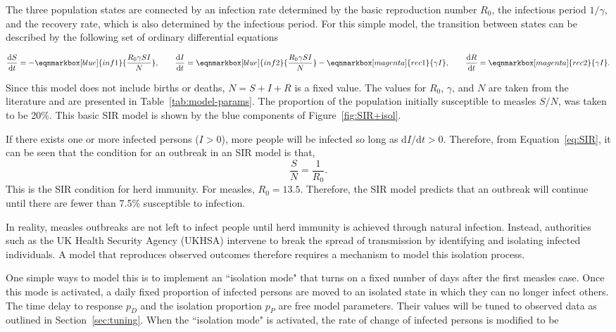 \documentclass{article}
\newcommand{\diff}{\mathrm{d}}
\begin{document}
The three population states are connected by an infection rate determined by the basic reproduction number $R_0$, the infectious period $1/\gamma$, and the recovery rate, which is also determined by the infectious period. For this simple model, the transition between states can be described by the following set of ordinary differential equations

\vspace{0.5em}
\begin{equation}
    \frac{\diff S}{\diff t} = -\eqnmarkbox[blue]{inf1}{\frac{R_0\gamma SI}{N}}, 
    \qquad 
    \frac{\diff I}{\diff t} = \eqnmarkbox[blue]{inf2}{\frac{R_0\gamma SI}{N}} - \eqnmarkbox[magenta]{rec1}{\gamma I}, 
    \qquad 
    \frac{\diff R}{\diff t} = \eqnmarkbox[magenta]{rec2}{\gamma I}.
    \label{eq:SIR}
\end{equation}
\vspace{1.5em}

Since this model does not include births or deaths, $N = S + I + R$ is a fixed value. The values for $R_0$, $\gamma$, and $N$ are taken from the literature and are presented in Table~\ref{tab:model-params}. The proportion of the population initially susceptible to measles $S/N$, was taken to be 20\%. This basic SIR model is shown by the blue components of Figure~\ref{fig:SIR+isol}. 

If there exists one or more infected persons ($I>0$), more people will be infected so long as $\diff I / \diff t >0$. Therefore, from Equation~\ref{eq:SIR}, it can be seen that the condition for an outbreak in an SIR model is that, 
%
\begin{equation}
    \frac{S}{N} = \frac{1}{R_0}.
\end{equation}
%
This is the SIR condition for herd immunity. For measles, $R_0=13.5$. Therefore, the SIR model predicts that an outbreak will continue until there are fewer than 7.5\% susceptible to infection. 

In reality, measles outbreaks are not left to infect people until herd immunity is achieved through natural infection. Instead, authorities such as the UK Health Security Agency (UKHSA) intervene to break the spread of transmission by identifying and isolating infected individuals. A model that reproduces observed outcomes therefore requires a mechanism to model this isolation process. 

One simple ways to model this is to implement an ``isolation mode" that turns on a fixed number of days after the first measles case. Once this mode is activated, a daily fixed proportion of infected persons are moved to an isolated state in which they can no longer infect others. The time delay to response $p_D$ and the isolation proportion $p_P$ are free model parameters. Their values will be tuned to observed data as outlined in Section~\ref{sec:tuning}. When the ``isolation mode" is activated, the rate of change of infected persons is modified to be
\end{document}
